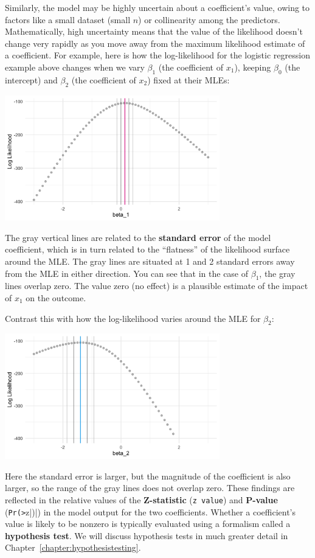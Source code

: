 Similarly, the model may be highly uncertain about a coefficient's value, owing to factors like a small dataset (small $n$) or collinearity among the predictors. Mathematically, high uncertainty means that the value of the likelihood doesn't change very rapidly as you move away from the maximum likelihood estimate of a coefficient. For example, here is how the log-likelihood for the logistic regression example above changes when we vary $\beta_1$ (the coefficient of $x_1$), keeping $\beta_0$ (the intercept) and $\beta_2$ (the coefficient of $x_2$) fixed at their MLEs: 
\begin{center}
\includegraphics[width=0.7\textwidth]{img/esl-logistic-beta1.png}
\end{center}
The gray vertical lines are related to the \textbf{standard error} of the model coefficient, which is in turn related to the ``flatness'' of the likelihood surface around the MLE. The gray lines are situated at 1 and 2 standard errors away from the MLE in either direction. You can see that in the case of $\beta_1$, the gray lines overlap zero. The value zero (no effect) is a plausible estimate of the impact of $x_1$ on the outcome. 

Contrast this with how the log-likelihood varies around the MLE for $\beta_2$:
\begin{center}
\includegraphics[width=0.7\textwidth]{img/esl-logistic-beta2.png}
\end{center}
Here the standard error is larger, but the magnitude of the coefficient is also larger, so the range of the gray lines does not overlap zero. These findings are reflected in the relative values of the \textbf{Z-statistic} (\texttt{z value}) and \textbf{P-value} (\verb|Pr(>|z|)|) in the model output for the two coefficients. Whether a coefficient's value is likely to be nonzero is typically evaluated using a formalism called a \textbf{hypothesis test}. We will discuss hypothesis tests in much greater detail in Chapter~\ref{chapter:hypothesistesting}. 

